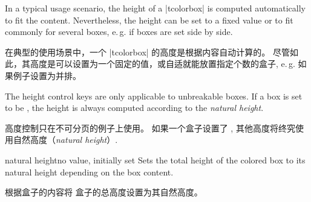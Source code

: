 In a typical usage scenario, the height of a |tcolorbox| is computed automatically
to fit the content. Nevertheless, the height can be set to a fixed value
or to fit commonly for several boxes, e.\,g. if boxes are set side by side.

在典型的使用场景中，一个 |tcolorbox| 的高度是根据内容自动计算的。 
尽管如此，其高度是可以设置为一个固定的值，或自适就能放置指定个数的盒子, e.\,g. 如果例子设置为并排。

\bigskip
\begin{marker}
The height control keys are only applicable to unbreakable boxes.
If a box is set to be , the height is always
computed according to the \emph{natural height}.

高度控制只在不可分页的例子上使用。
如果一个盒子设置了 , 其他高度将终究使用自然高度（\emph{natural height}）.
\end{marker}
\bigskip


\begin{docTcbKey}{natural height}{}{no value, initially set}
Sets the total height of the colored box to its natural height depending
on the box content.

根据盒子的内容将%
盒子的总高度设置为其自然高度。
\end{docTcbKey}

